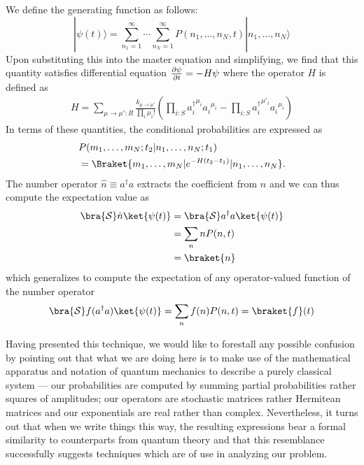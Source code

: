 We define the generating function as follows:
$$
| \psi (t) \rangle =
\sum_{n_1 = 1}^\infty \cdots \sum_{n_N = 1}^\infty
P (n_1, \ldots, n_N, t) |n_1, \ldots, n_N \rangle
$$
Upon substituting this into the master equation and simplifying, we find
that this quantity satisfies differential equation ${\partial \psi \over
\partial t} = - H \psi$ where the operator $H$ is defined as
\begin{align*}
H = \sum_{\mu \rightarrow \mu' \colon R} \frac{k_{\mu \rightarrow \mu'}}{\prod_i \mu_i !} \left(\prod_{i \colon S} {a_i^{\dagger}}^{\mu_i}{a_i^{}}^{\mu_i} - \prod_{i \colon S} {a_i^{\dagger}}^{\mu'_i}{a_i^{}}^{\mu_i} \right)
\end{align*}
In terms of these quantities, the conditional probabilities are expressed as
\begin{align*}
&P(m_1, \ldots, m_N; t_2 | n_1,\ldots,n_N ; t_1)\\
&= \Braket{m_1, \ldots, m_N| e^{-H(t_2-t_1)}|n_1, \ldots, n_N}.
\end{align*}
The number operator $\hat{n} \equiv a^{\dagger} a$ extracts the coefficient from $n$ and we can thus compute the expectation value as
\begin{align*}
\bra{\mathcal{S}}\hat{n} \ket{\psi(t)} &= \bra{\mathcal{S}}a^{\dagger} a \ket{\psi(t)}\\
&= \sum_{n} n P(n,t) \\
&= \braket{n}
\end{align*}
which generalizes to compute the expectation of any operator-valued function of the number operator
$$\bra{\mathcal{S}} f(a^{\dagger} a) \ket{\psi(t)} = \sum_{n} f(n) P(n,t)=\braket{f}(t)$$

Having presented this technique, we would like to forestall any possible
confusion by pointing out that what we are doing here is to make use of
the mathematical apparatus and notation of quantum mechanics to describe
a purely classical system --- our probabilities are computed by summing
partial probabilities rather squares of amplitudes; our operators are
stochastic matrices rather Hermitean matrices and our exponentials are
real rather than complex.  Nevertheless, it turns out that when we write
things this way, the resulting expressions bear a formal similarity to
counterparts from quantum theory and that this resemblance successfully
suggests techniques which are of use in analyzing our problem.

